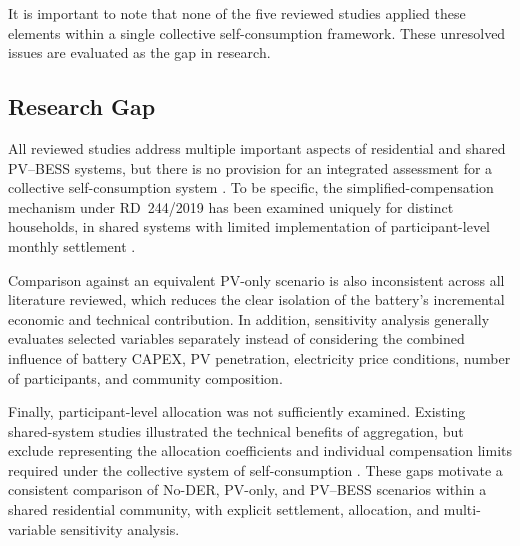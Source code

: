 It is important to note that none of the five reviewed studies applied these elements within a single collective self-consumption framework. These unresolved issues are evaluated as the gap in research.

\subsection{Research Gap}
\label{subsec:research-gap}

All reviewed studies address multiple important aspects of residential and
shared PV--BESS systems, but there is no provision for an integrated assessment
for a collective self-consumption system
\cite{ch2ref002,ch2ref031,ch2ref051,ch2ref062,ch2ref066}. To be specific,
the simplified-compensation mechanism under RD~244/2019 has been examined
uniquely for distinct households, in shared systems with limited implementation of
participant-level monthly settlement
\cite{ch2ref062}.

Comparison against an equivalent PV-only scenario is also inconsistent across
all literature reviewed, which reduces the clear isolation of the battery's
incremental economic and technical contribution. In addition, sensitivity analysis generally evaluates selected variables separately instead of considering the combined influence of battery CAPEX, PV penetration, electricity price conditions, number of participants, and community composition.

Finally, participant-level allocation was not sufficiently examined.
Existing shared-system studies illustrated the technical benefits of
aggregation, but exclude representing the allocation coefficients and
individual compensation limits required under the collective system of self-consumption \cite{ch2ref051}. These gaps motivate a consistent
comparison of No-DER, PV-only, and PV--BESS scenarios within a shared
residential community, with explicit settlement, allocation, and
multi-variable sensitivity analysis.



